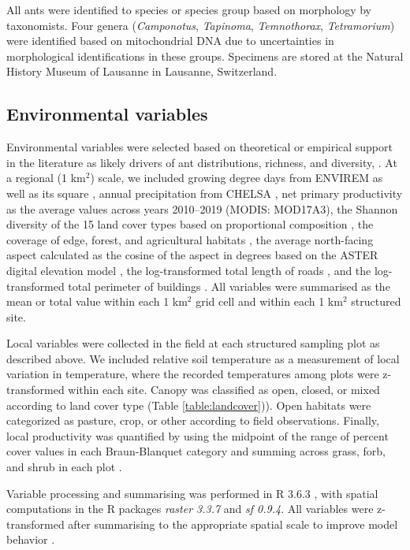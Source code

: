 \documentclass[preprint,final,times,12pt,3p]{elsarticle}
\begin{document}
All ants were identified to species or species group based on morphology by taxonomists. Four genera (\emph{Camponotus}, \emph{Tapinoma}, \emph{Temnothorax}, \emph{Tetramorium}) were identified based on mitochondrial DNA due to uncertainties in morphological identifications in these groups. Specimens are stored at the Natural History Museum of Lausanne in Lausanne, Switzerland. 


\subsection{Environmental variables}
Environmental variables were selected based on theoretical or empirical support in the literature as likely drivers of ant distributions, richness, and diversity, \citep{Bishop2017,Liu2018,Szewczyk2018,Longino2019,Uhey2020}. At a regional (1 km$^2$) scale, we included growing degree days from ENVIREM as well as its square \citep{Title2018}, annual precipitation from CHELSA \citep{Karger2017}, net primary productivity as the average values across years 2010–2019 (MODIS: MOD17A3), the Shannon diversity of the 15 land cover types based on proportional composition \citep{Gago-Silva2017}, the coverage of edge, forest, and agricultural habitats \citep{Gago-Silva2017}, the average north-facing aspect calculated as the cosine of the aspect in degrees based on the ASTER digital elevation model \citep{Tachikawa2011}, the log-transformed total length of roads \citep{OpenStreetMap}, and the log-transformed total perimeter of buildings \citep{OpenStreetMap}. All variables were summarised as the mean or total value within each 1 km$^2$ grid cell and within each 1 km$^2$ structured site.

Local variables were collected in the field at each structured sampling plot as described above. We included relative soil temperature as a measurement of local variation in temperature, where the recorded temperatures among plots were z-transformed within each site. Canopy was classified as open, closed, or mixed according to land cover type (Table \ref{table:landcover})). Open habitats were categorized as pasture, crop, or other according to field observations. Finally, local productivity was quantified by using the midpoint of the range of percent cover values in each Braun-Blanquet category and summing across grass, forb, and shrub in each plot \citep{Douglas1978,Mccain2018,Szewczyk2018}.

Variable processing and summarising was performed in R 3.6.3 \citep{R-3-6-3}, with spatial computations in the R packages \emph{raster 3.3.7} and \emph{sf 0.9.4}. All variables were z-transformed after summarising to the appropriate spatial scale to improve model behavior \citep{Carpenter2017}.
\end{document}
